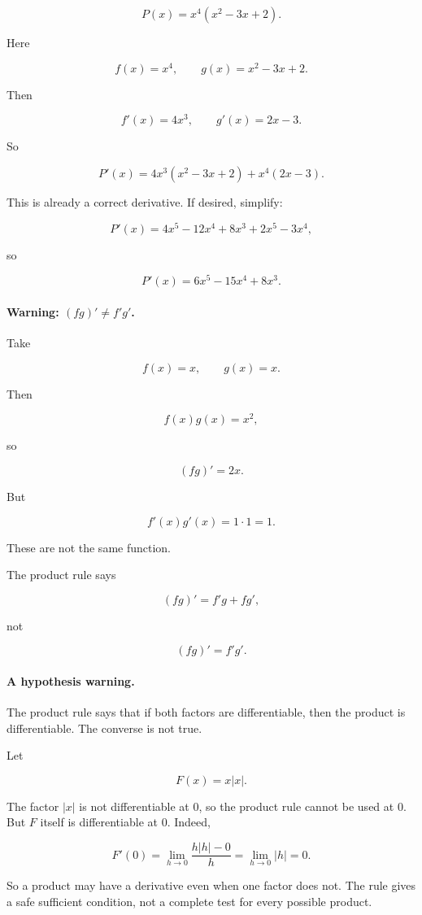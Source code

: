 \[
P(x)=x^4(x^2-3x+2).
\]

Here

\[
f(x)=x^4,
\qquad
g(x)=x^2-3x+2.
\]

Then

\[
f'(x)=4x^3,
\qquad
g'(x)=2x-3.
\]

So

\[
P'(x)=4x^3(x^2-3x+2)+x^4(2x-3).
\]

This is already a correct derivative.  If desired, simplify:

\[
P'(x)=4x^5-12x^4+8x^3+2x^5-3x^4,
\]

so

\[
\boxed{
P'(x)=6x^5-15x^4+8x^3.
}
\]

\paragraph{Warning: \((fg)'\neq f'g'\).}
Take

\[
f(x)=x,
\qquad
g(x)=x.
\]

Then

\[
f(x)g(x)=x^2,
\]

so

\[
(fg)'=2x.
\]

But

\[
f'(x)g'(x)=1\cdot1=1.
\]

These are not the same function.

The product rule says

\[
(fg)'=f'g+fg',
\]

not

\[
(fg)'=f'g'.
\]

\paragraph{A hypothesis warning.}
The product rule says that if both factors are differentiable, then the product is differentiable.  The converse is not true.

Let

\[
F(x)=x|x|.
\]

The factor \(|x|\) is not differentiable at \(0\), so the product rule cannot be used at \(0\).  But \(F\) itself is differentiable at \(0\).  Indeed,

\[
F'(0)
=
\lim_{h\to0}\frac{h|h|-0}{h}
=
\lim_{h\to0}|h|
=
0.
\]

So a product may have a derivative even when one factor does not.  The rule gives a safe sufficient condition, not a complete test for every possible product.

